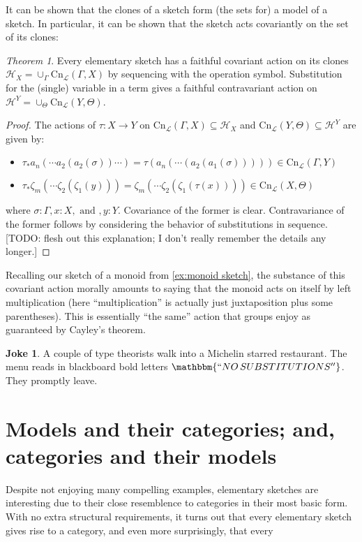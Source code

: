 \documentclass[12pt,twoside]{reedthesis}
\theoremstyle{definition}
\newtheorem{joke}{Joke}
\theoremstyle{remark}
\theoremstyle{theorem}
\newtheorem{theorem}{Theorem}
\begin{document}
  It can be shown that the clones of a sketch form (the sets for) a model of a
  sketch. In particular, it can be shown that the sketch acts covariantly on the
  set of its clones:
  \begin{theorem}\label{thm:clone model}
    Every elementary sketch has a faithful covariant action on its clones
    \(\mathcal{H}_{X} = \cup_{\Gamma} \text{Cn}_{\mathcal{L}}(\Gamma,X)\) by sequencing with
    the operation symbol. Substitution for the (single) variable in a term gives
    a faithful contravariant action on
    \(\mathcal{H}^{Y} = \cup_{\Theta} \text{Cn}_{\mathcal{L}}(Y,\Theta)\).
  \end{theorem}
  \begin{proof}
    The actions of \(\tau : X \rightarrow Y\) on
    \(\text{Cn}_\mathcal{L}(\Gamma,X) \subseteq \mathcal{H}_{X}\) and
    \(\text{Cn}_\mathcal{L}(Y,\Theta) \subseteq \mathcal{H}^{Y}\) are given by:
    \begin{itemize}
      \item \(\tau_{*}a_{n}(\cdots a_{2}(a_{2}(\sigma))\cdots) =
      \tau(a_{n}(\cdots(a_{2}(a_{1}(\sigma))))) \in
      \text{Cn}_{\mathcal{L}}(\Gamma,Y)\)
      \item \(\tau_{*}\zeta_{m}(\cdots \zeta_{2}(\zeta_{1}(y))) =
      \zeta_{m}(\cdots\zeta_{2}(\zeta_{1}(\tau(x)))) \in
      \text{Cn}_{\mathcal{L}}(X,\Theta)\)
    \end{itemize}
    where \(\sigma : \Gamma, x : X, \text { and }, y:Y\). Covariance of the former is
    clear. Contravariance of the former follows by considering the behavior of
    substitutions in sequence. [TODO: flesh out this explanation; I don't really
    remember the details any longer.]
  \end{proof}

  Recalling our sketch of a monoid from \ref{ex:monoid sketch}, the substance of
  this covariant action morally amounts to saying that the monoid acts on itself
  by left multiplication (here ``multiplication'' is actually just juxtaposition
  plus some parentheses). This is essentially ``the same'' action that groups
  enjoy as guaranteed by Cayley's theorem.

  \begin{joke}
    A couple of type theorists walk into a Michelin starred restaurant. The menu
    reads in blackboard bold letters $\mathbbm{``NO\, SUBSTITUTIONS''}$. They promptly leave.
  \end{joke}

\section{Models and their categories; and, categories and their models}
Despite not enjoying many compelling examples, elementary sketches are
interesting due to their close resemblence to categories in their most basic
form. With no extra structural requirements, it turns out that every elementary
sketch gives rise to a category, and even more surprisingly, that every
\end{document}
